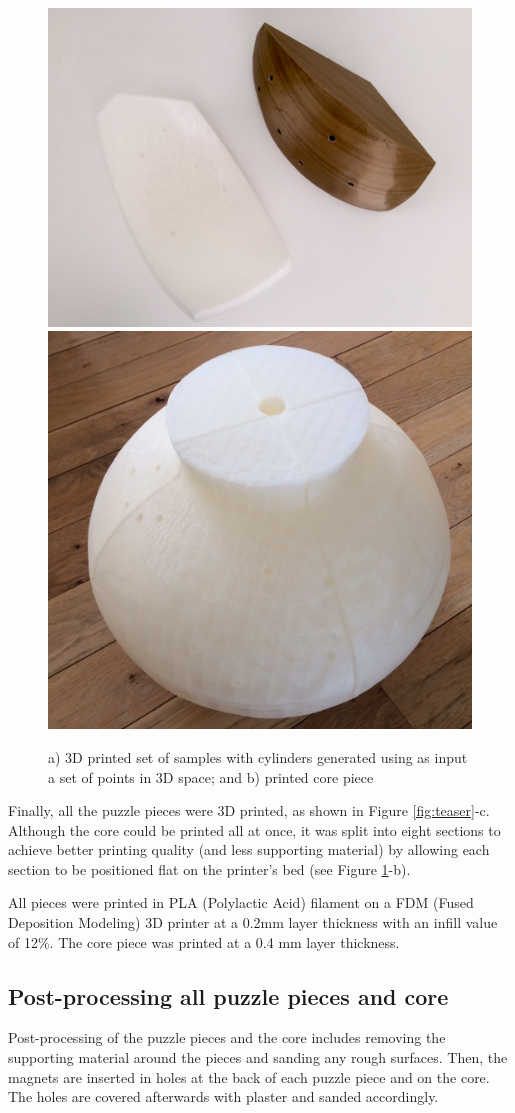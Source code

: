 \documentclass[acmlarge,screen]{acmart}
\begin{document}
\begin{figure}[h]
  \centering
  \includegraphics[width=0.45\linewidth]{images/coreANDpiece}
    \includegraphics[width=0.45\linewidth]{images/image1}

  \caption{\label{fig:test}
    a) 3D printed set of samples with cylinders generated using as input a set of points in 3D space; and b) printed core piece }
\end{figure}

Finally, all the puzzle pieces were 3D printed, as shown in Figure \ref{fig:teaser}-c. Although the core could be printed all at once, it was split into eight sections to achieve better printing quality (and less supporting material) by allowing each section to be positioned flat on the printer's bed (see Figure \ref{fig:test}-b).

All pieces were printed in PLA (Polylactic Acid) filament on a FDM (Fused Deposition Modeling) 3D printer at a 0.2mm layer thickness with an infill value of 12\%. The core piece was printed at a 0.4 mm layer thickness.


\subsection{Post-processing all puzzle pieces and core}
Post-processing of the puzzle pieces and the core includes removing the supporting material around the pieces and sanding any rough surfaces. Then, the magnets are inserted in holes at the back of each puzzle piece and on the core. The holes are covered afterwards with plaster and sanded accordingly.
\end{document}
